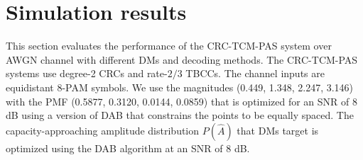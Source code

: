 \documentclass [PhD] {uclathes}
\begin{document}
\section{Simulation results} \label{sec: simu} 



This section evaluates the performance of the CRC-TCM-PAS system over AWGN channel with different DMs and decoding methods.  The CRC-TCM-PAS systems use degree-2 CRCs and rate-${2}/{3}$ TBCCs. The channel inputs are equidistant 8-PAM symbols. We use the magnitudes  (0.449, 1.348, 2.247, 3.146) with the PMF (0.5877, 0.3120, 0.0144, 0.0859) that is optimized for an SNR of 8 dB using a version of DAB that constrains the points to be equally spaced\cite{xiao2021finite}.
The capacity-approaching amplitude distribution $P(\hat{A})$ that DMs target is optimized using the DAB algorithm \cite{xiao2021finite} at an SNR of  8 dB. 
\end{document}
